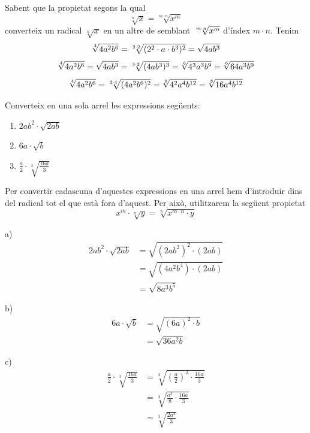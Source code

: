 \begin{solucio}
Sabent que la propietat segons la qual%
\begin{equation*}
\sqrt[n]{x}=\sqrt[m\cdot n]{x^{m}}
\end{equation*}%
converteix un radical $\sqrt[n]{x}$ en un altre de semblant $\sqrt[m\cdot n]{%
x^{m}}$ d’índex $m\cdot n$. Tenim%
\begin{equation*}
\sqrt[4]{4a^{2}b^{6}}=\sqrt[2\cdot 2]{(2^{2}\cdot a\cdot b^{3})^{2}}=\sqrt{%
4ab^{3}}
\end{equation*}%
\begin{equation*}
\sqrt[4]{4a^{2}b^{6}}=\sqrt{4ab^{3}}=\sqrt[3\cdot 2]{(4ab^{3})^{3}}=\sqrt[6]{%
4^{3}a^{3}b^{9}}=\sqrt[6]{64a^{3}b^{9}}
\end{equation*}%
\begin{equation*}
\sqrt[4]{4a^{2}b^{6}}=\sqrt[2\cdot 4]{(4a^{2}b^{6})^{2}}=\sqrt[8]{%
4^{2}a^{4}b^{12}}=\sqrt[8]{16a^{4}b^{12}}
\end{equation*}
\end{solucio}

\begin{exercici}
Converteix en una sola arrel les expressions següents:

\begin{enumerate}
\item[a)] $2ab^{2}\cdot \sqrt{2ab}$

\item[b)] $6a\cdot \sqrt{b}$

\item[c)] $\frac{a}{2}\cdot \sqrt[3]{\frac{16a}{3}}$
\end{enumerate}

\end{exercici}

\begin{solucio}
Per convertir cadascuna d’aquestes expressions en una arrel hem
d’introduir dins del radical tot el que està fora d’aquest. Per
això, utilitzarem la següent propietat%
\begin{equation*}
x^{m}\cdot \sqrt[n]{y}=\sqrt[n]{x^{m\cdot n}\cdot y}
\end{equation*}

a) 
\begin{align*}
2ab^{2}\cdot \sqrt{2ab} &=\sqrt{(2ab^{2})^{2}\cdot (2ab)} \\
&=\sqrt{(4a^{2}b^{4})\cdot (2ab)} \\
&=\sqrt{8a^{3}b^{5}}
\end{align*}

b)%
\begin{align*}
6a\cdot \sqrt{b} &=\sqrt{(6a)^{2}\cdot b} \\
&=\sqrt{36a^{2}b}
\end{align*}

c) 
\begin{align*}
\frac{a}{2}\cdot \sqrt[3]{\frac{16a}{3}} &=\sqrt[3]{\left( \frac{a}{2}%
\right) ^{3}\cdot \frac{16a}{3}} \\
&=\sqrt[3]{\frac{a^{3}}{8}\cdot \frac{16a}{3}} \\
&=\sqrt[3]{\frac{2a^{4}}{3}}
\end{align*}
\end{solucio}

